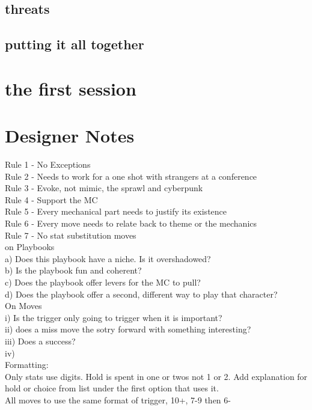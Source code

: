 \documentclass{tufte-book}
\begin{document}
\section{threats}			\label{sec: threats}
\section{putting it all together} 	\label{sec: putting it all together}

\chapter{the first session} \label{ch: the first session}

\chapter{Designer Notes}

Rule 1 - No Exceptions\\
Rule 2 - Needs to work for a one shot with strangers at a conference\\
Rule 3 - Evoke, not mimic, the sprawl and cyberpunk\\
Rule 4 - Support the MC\\
Rule 5 - Every mechanical part needs to justify its existence\\
Rule 6 - Every move needs to relate back to theme or the mechanics\\
Rule 7 - No stat substitution moves\\

on Playbooks\\
a) Does this playbook have a niche. Is it overshadowed?\\
b) Is the playbook fun and coherent?\\
c) Does the playbook offer levers for the MC to pull?\\
d) Does the playbook offer a second, different way to play that character?\\

On Moves\\
i) Is the trigger only going to trigger when it is important?\\
ii) does a miss move the sotry forward with something interesting?\\
iii) Does a success?\\
iv) \\

Formatting:\\
Only stats use digits. Hold is spent in one or twos not 1 or 2. Add explanation for hold or choice from list under the first option that uses it.\\
All moves to use the same format of trigger, 10+, 7-9 then 6-\\









\backmatter




\printindex[stuff]

\printindex
\end{document}
